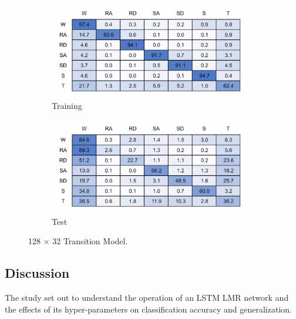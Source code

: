 \begin{figure}[!hbt]
    \centering
    \begin{subfigure}{.45\textwidth}
        \centering
        \includegraphics[width=\textwidth]{content/4-LSTM_Behaviour/results/conf_matricies/Training_128x32_T.jpg}
        \caption{Training}
        \label{fig:tran_model_conf_matrix_training_128x32}
    \end{subfigure}
    \begin{subfigure}{.45\textwidth}
        \centering
        \includegraphics[width=\textwidth]{content/4-LSTM_Behaviour/results/conf_matricies/Test_128x32_T.jpg}
	  \caption{Test}
        \label{fig:tran_model_conf_matrix_test_128x32}
    \end{subfigure}
    \caption{128 $\times$ 32 Transition Model.}
    \label{fig:128x32_transition_confusion_matrix}
\end{figure}

\subsection{Discussion}
\label{sec:discussion}
The study set out to understand the operation of an LSTM LMR network and the effects of its hyper-parameters on classification accuracy and generalization.

